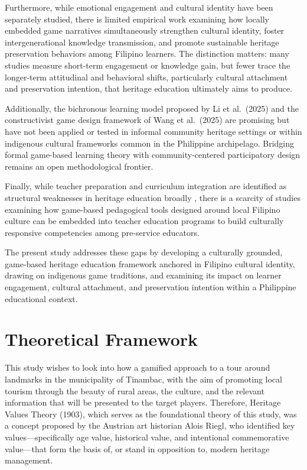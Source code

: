 \documentclass{research}
\begin{document}
Furthermore, while emotional engagement and cultural identity have been separately
studied, there is limited empirical work examining how locally embedded game narratives
simultaneously strengthen cultural identity, foster intergenerational knowledge
transmission, and promote sustainable heritage preservation behaviors among Filipino
learners. The distinction matters: many studies measure short-term engagement or
knowledge gain, but fewer trace the longer-term attitudinal and behavioral shifts,
particularly cultural attachment and preservation intention, that heritage education
ultimately aims to produce.

Additionally, the bichronous learning model proposed by Li et al.\ (2025) and the
constructivist game design framework of Wang et al.\ (2025) are promising but have not
been applied or tested in informal community heritage settings or within indigenous
cultural frameworks common in the Philippine archipelago. Bridging formal game-based
learning theory with community-centered participatory design remains an open
methodological frontier.

Finally, while teacher preparation and curriculum integration are identified as
structural weaknesses in heritage education broadly \citep{gulya2024,pitri2025}, there
is a scarcity of studies examining how game-based pedagogical tools designed around
local Filipino culture can be embedded into teacher education programs to build
culturally responsive competencies among pre-service educators.

The present study addresses these gaps by developing a culturally grounded, game-based
heritage education framework anchored in Filipino cultural identity, drawing on
indigenous game traditions, and examining its impact on learner engagement, cultural
attachment, and preservation intention within a Philippine educational context.

\section{Theoretical Framework}

This study wishes to look into how a gamified approach to a tour around landmarks in
the municipality of Tinambac, with the aim of promoting local tourism through the
beauty of rural areas, the culture, and the relevant information that will be presented
to the target players. Therefore, Heritage Values Theory (1903), which serves as the
foundational theory of this study, was a concept proposed by the Austrian art historian
Alois Riegl, who identified key values---specifically age value, historical value, and
intentional commemorative value---that form the basis of, or stand in opposition to,
modern heritage management.
\end{document}
